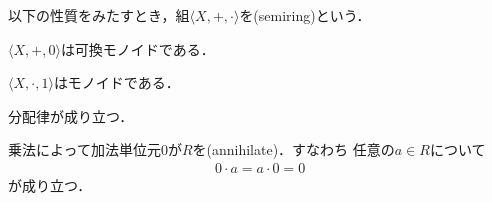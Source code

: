 \documentclass[../main.tex]{subfiles}
\begin{document}
\begin{thmbox}
\begin{definition} 以下の性質をみたすとき，組\(\langle X, \mathord{+}, \mathord{\cdot} \rangle\)を(semiring)という．
\begin{conditions}
    \item \(\langle X, \mathord{+}, 0 \rangle\)は可換モノイドである．
    \item \(\langle X, \mathord{\cdot}, 1 \rangle\)はモノイドである．
    \item 分配律が成り立つ．
    \item 乗法によって加法単位元\(0\)が\(R\)を(annihilate)．すなわち
        任意の\(a \in R\)について
        \begin{align}
            0 \cdot a = a \cdot 0 = 0
        \end{align}
        が成り立つ．
\end{conditions}
\end{definition}
\end{thmbox}
\end{document}
